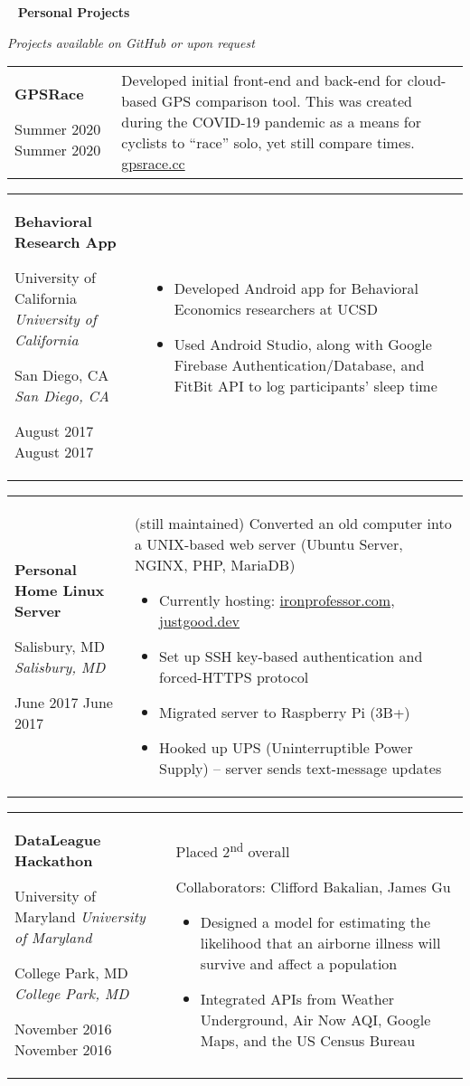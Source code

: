 \documentclass[11pt,letterpaper]{article}
\newcommand{\sect}[1]{
\begin{center}
	\noindent\xrfill[0.7ex]{0.5pt} \mbox{ } {\Large \bf #1} \mbox{ } \xrfill[0.7ex]{0.5pt}
\end{center}
}
\newcommand{\entry}[5]{
	\noindent
	\begin{tabular}{p{2in} p{\dimexpr \linewidth-2\tabcolsep-2.25in}} %
		\noindent \textbf{#1}
		
		\ifx #2  \else \noindent \textit{#2} \fi
		
		\ifx #3  \else \noindent \textit{#3} \fi
		
		\ifx #4  \else \noindent #4 \fi
		&
		#5
	\end{tabular}
	\vspace{0.5cm}
}
\begin{document}
	\sect{Personal Projects}

	\vspace*{-0.5cm}
	\begin{center}
		{\small \textit{Projects available on GitHub or upon request}}
	\end{center}
	
	\entry{GPSRace}{}{}{Summer 2020}{
		Developed initial front-end and back-end for cloud-based GPS comparison tool.
		This was created during the COVID-19 pandemic as a means for cyclists to ``race'' solo, yet still compare times.
		\href{https://gpsrace.cc}{gpsrace.cc}
	}
	
	\entry{Behavioral Research App}{University of California}{San Diego, CA}{August 2017}{
		\begin{itemize}[itemsep=0pt, nosep, wide]
			\item Developed Android app for Behavioral Economics researchers at UCSD
		
			\item Used Android Studio, along with Google Firebase Authentication/Database, and FitBit API to log participants' sleep time
		\end{itemize}
	}
	
	\entry{Personal Home Linux Server}{}{Salisbury, MD}{June 2017}{
		(still maintained) Converted an old computer into a UNIX-based web server (Ubuntu Server, NGINX, PHP, MariaDB)
		
		\begin{itemize}[itemsep=0pt, nosep, wide]
			\item Currently hosting: \href{https://ironprofessor.com}{ironprofessor.com}, \href{https://justgood.dev}{justgood.dev}
		
			\item Set up SSH key-based authentication and forced-HTTPS protocol
		
			\item Migrated server to Raspberry Pi (3B+)
		
			\item Hooked up UPS (Uninterruptible Power Supply) -- server sends text-message updates
		\end{itemize}
	}
	
	\entry{DataLeague Hackathon}{University of Maryland}{College Park, MD}{November 2016}{
		Placed 2\textsuperscript{nd} overall
		
		Collaborators: Clifford Bakalian, James Gu
		\begin{itemize}[itemsep=0pt, nosep, wide]
			\item Designed a model for estimating the likelihood that an airborne illness will survive and affect a population
		
			\item Integrated APIs from Weather Underground, Air Now AQI, Google Maps, and the US Census Bureau
		\end{itemize}
	}
	
\end{document}
